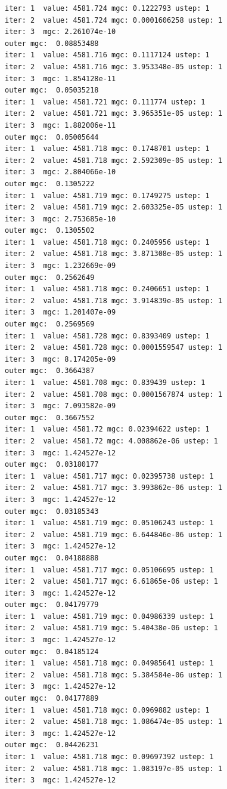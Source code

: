\documentclass[
  letterpaper,
  DIV=11,
  numbers=noendperiod]{scrartcl}
\begin{document}
\begin{verbatim}
iter: 1  value: 4581.724 mgc: 0.1222793 ustep: 1 
iter: 2  value: 4581.724 mgc: 0.0001606258 ustep: 1 
iter: 3  mgc: 2.261074e-10 
outer mgc:  0.08853488 
iter: 1  value: 4581.716 mgc: 0.1117124 ustep: 1 
iter: 2  value: 4581.716 mgc: 3.953348e-05 ustep: 1 
iter: 3  mgc: 1.854128e-11 
outer mgc:  0.05035218 
iter: 1  value: 4581.721 mgc: 0.111774 ustep: 1 
iter: 2  value: 4581.721 mgc: 3.965351e-05 ustep: 1 
iter: 3  mgc: 1.882006e-11 
outer mgc:  0.05005644 
iter: 1  value: 4581.718 mgc: 0.1748701 ustep: 1 
iter: 2  value: 4581.718 mgc: 2.592309e-05 ustep: 1 
iter: 3  mgc: 2.804066e-10 
outer mgc:  0.1305222 
iter: 1  value: 4581.719 mgc: 0.1749275 ustep: 1 
iter: 2  value: 4581.719 mgc: 2.603325e-05 ustep: 1 
iter: 3  mgc: 2.753685e-10 
outer mgc:  0.1305502 
iter: 1  value: 4581.718 mgc: 0.2405956 ustep: 1 
iter: 2  value: 4581.718 mgc: 3.871308e-05 ustep: 1 
iter: 3  mgc: 1.232669e-09 
outer mgc:  0.2562649 
iter: 1  value: 4581.718 mgc: 0.2406651 ustep: 1 
iter: 2  value: 4581.718 mgc: 3.914839e-05 ustep: 1 
iter: 3  mgc: 1.201407e-09 
outer mgc:  0.2569569 
iter: 1  value: 4581.728 mgc: 0.8393409 ustep: 1 
iter: 2  value: 4581.728 mgc: 0.0001559547 ustep: 1 
iter: 3  mgc: 8.174205e-09 
outer mgc:  0.3664387 
iter: 1  value: 4581.708 mgc: 0.839439 ustep: 1 
iter: 2  value: 4581.708 mgc: 0.0001567874 ustep: 1 
iter: 3  mgc: 7.093582e-09 
outer mgc:  0.3667552 
iter: 1  value: 4581.72 mgc: 0.02394622 ustep: 1 
iter: 2  value: 4581.72 mgc: 4.008862e-06 ustep: 1 
iter: 3  mgc: 1.424527e-12 
outer mgc:  0.03180177 
iter: 1  value: 4581.717 mgc: 0.02395738 ustep: 1 
iter: 2  value: 4581.717 mgc: 3.993862e-06 ustep: 1 
iter: 3  mgc: 1.424527e-12 
outer mgc:  0.03185343 
iter: 1  value: 4581.719 mgc: 0.05106243 ustep: 1 
iter: 2  value: 4581.719 mgc: 6.644846e-06 ustep: 1 
iter: 3  mgc: 1.424527e-12 
outer mgc:  0.04188888 
iter: 1  value: 4581.717 mgc: 0.05106695 ustep: 1 
iter: 2  value: 4581.717 mgc: 6.61865e-06 ustep: 1 
iter: 3  mgc: 1.424527e-12 
outer mgc:  0.04179779 
iter: 1  value: 4581.719 mgc: 0.04986339 ustep: 1 
iter: 2  value: 4581.719 mgc: 5.40438e-06 ustep: 1 
iter: 3  mgc: 1.424527e-12 
outer mgc:  0.04185124 
iter: 1  value: 4581.718 mgc: 0.04985641 ustep: 1 
iter: 2  value: 4581.718 mgc: 5.384584e-06 ustep: 1 
iter: 3  mgc: 1.424527e-12 
outer mgc:  0.04177889 
iter: 1  value: 4581.718 mgc: 0.0969882 ustep: 1 
iter: 2  value: 4581.718 mgc: 1.086474e-05 ustep: 1 
iter: 3  mgc: 1.424527e-12 
outer mgc:  0.04426231 
iter: 1  value: 4581.718 mgc: 0.09697392 ustep: 1 
iter: 2  value: 4581.718 mgc: 1.083197e-05 ustep: 1 
iter: 3  mgc: 1.424527e-12 

\end{verbatim}
\end{document}
